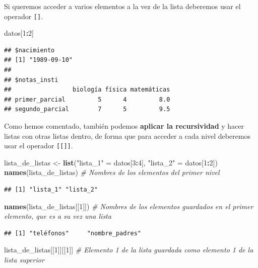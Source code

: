 \documentclass[11pt,]{book}
\newenvironment{Shaded}{\begin{snugshade}}{\end{snugshade}}
\newcommand{\CommentTok}[1]{\textcolor[rgb]{0.37,0.37,0.37}{\textit{#1}}}
\newcommand{\DecValTok}[1]{\textcolor[rgb]{0.06,0.06,0.06}{#1}}
\newcommand{\KeywordTok}[1]{\textcolor[rgb]{0.27,0.27,0.27}{\textbf{#1}}}
\newcommand{\NormalTok}[1]{#1}
\newcommand{\OperatorTok}[1]{\textcolor[rgb]{0.43,0.43,0.43}{\textbf{#1}}}
\newcommand{\StringTok}[1]{\textcolor[rgb]{0.5,0.5,0.5}{#1}}
\begin{document}
Si queremos acceder a varios elementos a la vez de la lista deberemos usar el operador \texttt{{[}{]}}.

\begin{Shaded}
\begin{Highlighting}[]
\NormalTok{datos[}\DecValTok{1}\OperatorTok{:}\DecValTok{2}\NormalTok{]}
\end{Highlighting}
\end{Shaded}

\begin{verbatim}
## $nacimiento
## [1] "1989-09-10"
## 
## $notas_insti
##                 biología física matemáticas
## primer_parcial         5      4         8.0
## segundo_parcial        7      5         9.5
\end{verbatim}

Como hemos comentado, también podemos \textbf{aplicar la recursividad} y hacer listas con otras listas dentro, de forma que para acceder a cada nivel deberemos usar el operador \texttt{{[}{[}{]}{]}}.

\begin{Shaded}
\begin{Highlighting}[]
\NormalTok{lista_de_listas <-}\StringTok{ }\KeywordTok{list}\NormalTok{(}\StringTok{"lista_1"}\NormalTok{ =}\StringTok{ }\NormalTok{datos[}\DecValTok{3}\OperatorTok{:}\DecValTok{4}\NormalTok{], }\StringTok{"lista_2"}\NormalTok{ =}\StringTok{ }\NormalTok{datos[}\DecValTok{1}\OperatorTok{:}\DecValTok{2}\NormalTok{])}
\KeywordTok{names}\NormalTok{(lista_de_listas) }\CommentTok{# Nombres de los elementos del primer nivel}
\end{Highlighting}
\end{Shaded}

\begin{verbatim}
## [1] "lista_1" "lista_2"
\end{verbatim}

\begin{Shaded}
\begin{Highlighting}[]
\KeywordTok{names}\NormalTok{(lista_de_listas[[}\DecValTok{1}\NormalTok{]]) }\CommentTok{# Nombres de los elementos guardados en el primer elemento, que es a su vez una lista}
\end{Highlighting}
\end{Shaded}

\begin{verbatim}
## [1] "teléfonos"     "nombre_padres"
\end{verbatim}

\begin{Shaded}
\begin{Highlighting}[]
\NormalTok{lista_de_listas[[}\DecValTok{1}\NormalTok{]][[}\DecValTok{1}\NormalTok{]] }\CommentTok{# Elemento 1 de la lista guardada como elemento 1 de la lista superior}
\end{Highlighting}
\end{Shaded}
\end{document}
